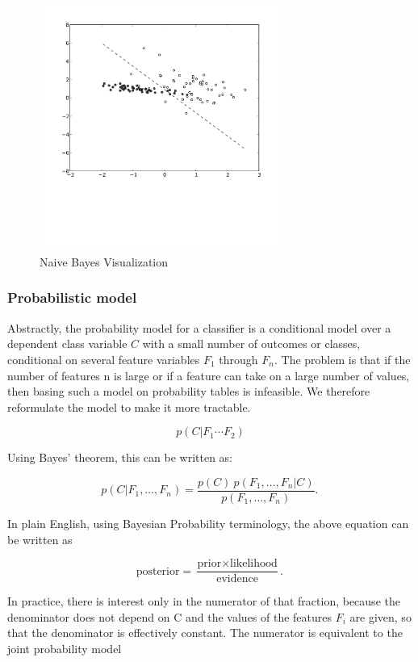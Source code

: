 \documentclass[12pt]{book}
\begin{document}
\begin{figure}[H]
\centering
\includegraphics[width=8cm]{Linear-svm-scatterplot.png}
\caption{Naive Bayes Visualization\cite{wikipedia-naive}}
\label{fig:figure1}
\end{figure}

\subsubsection{Probabilistic model}
Abstractly, the probability model for a classifier is a conditional model over a dependent class variable $C$ with a small number of outcomes or classes, conditional on several feature variables $F_1$ through $F_n$. The problem is that if the number of features n is large or if a feature can take on a large number of values, then basing such a model on probability tables is infeasible. We therefore reformulate the model to make it more tractable.

$$ p(C|F_1\cdots F_2) $$

Using Bayes' theorem, this can be written as:

$$ p(C \vert F_1,\dots,F_n) = \frac{p(C) \ p(F_1,\dots,F_n\vert C)}{p(F_1,\dots,F_n)}. \,$$

In plain English, using Bayesian Probability terminology, the above equation can be written as

$$\mbox{posterior} = \frac{\mbox{prior} \times \mbox{likelihood}}{\mbox{evidence}}. \,$$

In practice, there is interest only in the numerator of that fraction, because the denominator does not depend on C and the values of the features $F_i$ are given, so that the denominator is effectively constant. The numerator is equivalent to the joint probability model
\end{document}
